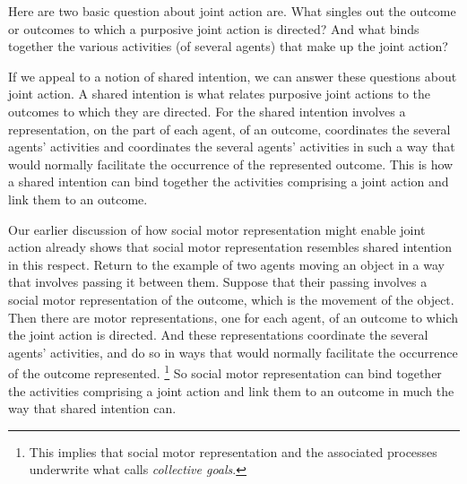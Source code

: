 \documentclass[12pt,\papersize]{extarticle}
\begin{document}
Here are two basic question about  joint action are.
What singles out the outcome or outcomes to which a purposive joint action is directed?
And what binds together the various activities (of several agents) that make up the joint action?

If we appeal to a notion of shared intention,
we can answer these questions about joint action.
A shared intention is what relates purposive joint actions to the outcomes to which they are directed.
For the shared intention 
involves a representation, on the part of each agent, of an outcome,
coordinates the several agents’ activities
and 
coordinates the several agents’ activities in such a way that would normally facilitate the occurrence of the represented outcome.
This is how a shared intention can bind together the activities comprising a joint action and link them to an outcome.


Our earlier discussion of how social motor representation might enable joint action already shows that social motor representation resembles shared intention in this respect.
Return to the example of two agents moving an object in a way that involves passing it between them.
Suppose that their passing involves a social motor representation of the outcome,
which is the movement of the object. 
Then there are motor representations, one for each agent, 
of an outcome to which the joint action is directed.
And these representations coordinate the several agents' activities,
and 
do so in ways that would normally facilitate the occurrence of the  outcome represented.%
\footnote{
This implies that social motor representation and the associated processes underwrite what \citet{Butterfill:2011_wija} calls \textit{collective goals}.
}
So social motor representation can bind together the activities comprising a joint action and link them to an outcome in much the way that shared intention can.

\end{document}
